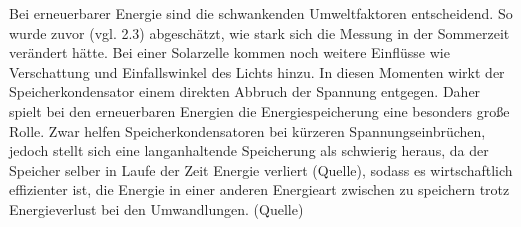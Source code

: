         
        
        
        \par Bei erneuerbarer Energie sind die schwankenden Umweltfaktoren entscheidend. So wurde zuvor (vgl. 2.3) abgeschätzt, wie stark sich die Messung in der Sommerzeit verändert hätte. Bei einer Solarzelle kommen noch weitere Einflüsse wie Verschattung und Einfallswinkel des Lichts hinzu. In diesen Momenten wirkt der Speicherkondensator einem direkten Abbruch der Spannung entgegen. Daher spielt bei den erneuerbaren Energien die Energiespeicherung eine besonders große Rolle. Zwar helfen Speicherkondensatoren bei kürzeren Spannungseinbrüchen, jedoch stellt sich eine langanhaltende Speicherung als schwierig heraus, da der Speicher selber in Laufe der Zeit Energie verliert (Quelle), sodass es wirtschaftlich effizienter ist, die Energie in einer anderen Energieart zwischen zu speichern trotz Energieverlust bei den Umwandlungen. (Quelle) 


